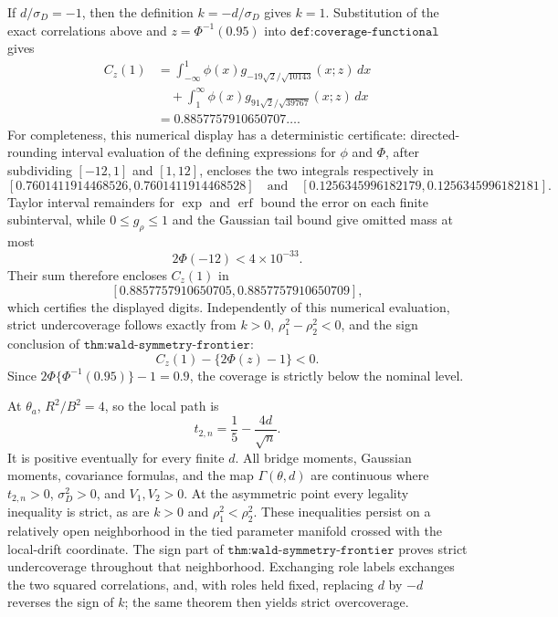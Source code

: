 If \(d/\sigma_D=-1\), then the definition \(k=-d/\sigma_D\) gives \(k=1\).  Substitution of the exact correlations above and \(z=\Phi^{-1}(0.95)\) into \(\texttt{def:coverage-functional}\) gives
\[
 \begin{aligned}
 C_z(1)
 &=\int_{-\infty}^{1}\phi(x)
   g_{-19\sqrt2/\sqrt{10143}}(x;z)\,dx\\
 &\quad+\int_{1}^{\infty}\phi(x)
   g_{91\sqrt2/\sqrt{39767}}(x;z)\,dx\\
 &=0.8857757910650707\ldots.
 \end{aligned}
\]
For completeness, this numerical display has a deterministic certificate: directed-rounding interval evaluation of the defining expressions for \(\phi\) and \(\Phi\), after subdividing \([-12,1]\) and \([1,12]\), encloses the two integrals respectively in
\[
 [0.7601411914468526,0.7601411914468528]
 \quad\text{and}\quad
 [0.1256345996182179,0.1256345996182181].
\]
Taylor interval remainders for \(\exp\) and \(\operatorname{erf}\) bound the error on each finite subinterval, while \(0\leq g_\rho\leq1\) and the Gaussian tail bound give omitted mass at most
\[
 2\Phi(-12)<4\times10^{-33}.
\]
Their sum therefore encloses \(C_z(1)\) in
\[
 [0.8857757910650705,0.8857757910650709],
\]
which certifies the displayed digits.  Independently of this numerical evaluation, strict undercoverage follows exactly from \(k>0\), \(\rho_1^2-\rho_2^2<0\), and the sign conclusion of \(\texttt{thm:wald-symmetry-frontier}\):
\[
 C_z(1)-\{2\Phi(z)-1\}<0.
\]
Since \(2\Phi\{\Phi^{-1}(0.95)\}-1=0.9\), the coverage is strictly below the nominal level.

At \(\theta_a\), \(R^2/B^2=4\), so the local path is
\[
 t_{2,n}=\frac15-\frac{4d}{\sqrt n}.
\]
It is positive eventually for every finite \(d\).  All bridge moments, Gaussian moments, covariance formulas, and the map \(\Gamma(\theta,d)\) are continuous where \(t_{2,n}>0\), \(\sigma_D^2>0\), and \(V_1,V_2>0\).  At the asymmetric point every legality inequality is strict, as are \(k>0\) and \(\rho_1^2<\rho_2^2\).  These inequalities persist on a relatively open neighborhood in the tied parameter manifold crossed with the local-drift coordinate.  The sign part of \(\texttt{thm:wald-symmetry-frontier}\) proves strict undercoverage throughout that neighborhood.  Exchanging role labels exchanges the two squared correlations, and, with roles held fixed, replacing \(d\) by \(-d\) reverses the sign of \(k\); the same theorem then yields strict overcoverage.

